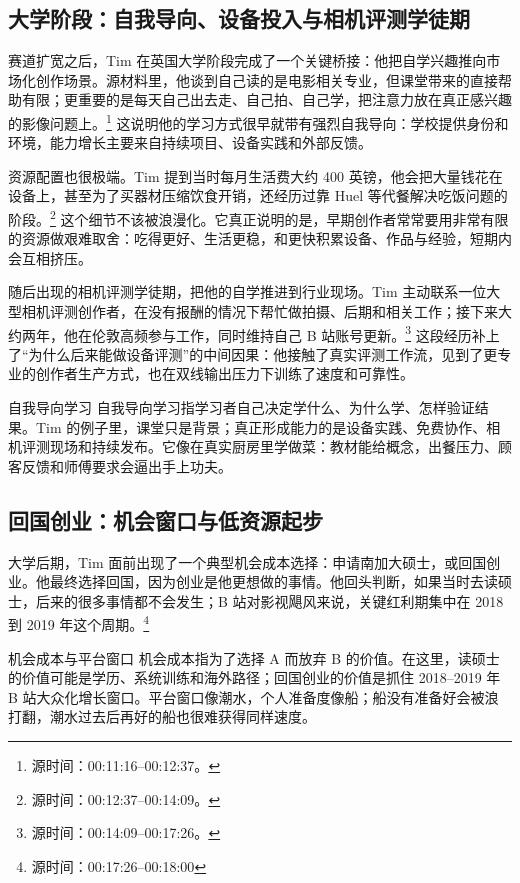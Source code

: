 \documentclass[a4paper]{article}
\begin{document}
\subsection{大学阶段：自我导向、设备投入与相机评测学徒期}

赛道扩宽之后，Tim 在英国大学阶段完成了一个关键桥接：他把自学兴趣推向市场化创作场景。源材料里，他谈到自己读的是电影相关专业，但课堂带来的直接帮助有限；更重要的是每天自己出去走、自己拍、自己学，把注意力放在真正感兴趣的影像问题上。\footnote{源时间：00:11:16--00:12:37。} 这说明他的学习方式很早就带有强烈自我导向：学校提供身份和环境，能力增长主要来自持续项目、设备实践和外部反馈。

资源配置也很极端。Tim 提到当时每月生活费大约 400 英镑，他会把大量钱花在设备上，甚至为了买器材压缩饮食开销，还经历过靠 Huel 等代餐解决吃饭问题的阶段。\footnote{源时间：00:12:37--00:14:09。} 这个细节不该被浪漫化。它真正说明的是，早期创作者常常要用非常有限的资源做艰难取舍：吃得更好、生活更稳，和更快积累设备、作品与经验，短期内会互相挤压。

随后出现的相机评测学徒期，把他的自学推进到行业现场。Tim 主动联系一位大型相机评测创作者，在没有报酬的情况下帮忙做拍摄、后期和相关工作；接下来大约两年，他在伦敦高频参与工作，同时维持自己 B 站账号更新。\footnote{源时间：00:14:09--00:17:26。} 这段经历补上了“为什么后来能做设备评测”的中间因果：他接触了真实评测工作流，见到了更专业的创作者生产方式，也在双线输出压力下训练了速度和可靠性。

\begin{knowledgebox}{自我导向学习}
自我导向学习指学习者自己决定学什么、为什么学、怎样验证结果。Tim 的例子里，课堂只是背景；真正形成能力的是设备实践、免费协作、相机评测现场和持续发布。它像在真实厨房里学做菜：教材能给概念，出餐压力、顾客反馈和师傅要求会逼出手上功夫。
\end{knowledgebox}

\subsection{回国创业：机会窗口与低资源起步}

大学后期，Tim 面前出现了一个典型机会成本选择：申请南加大硕士，或回国创业。他最终选择回国，因为创业是他更想做的事情。他回头判断，如果当时去读硕士，后来的很多事情都不会发生；B 站对影视飓风来说，关键红利期集中在 2018 到 2019 年这个周期。\footnote{源时间：00:17:26--00:18:00}

\begin{knowledgebox}{机会成本与平台窗口}
机会成本指为了选择 A 而放弃 B 的价值。在这里，读硕士的价值可能是学历、系统训练和海外路径；回国创业的价值是抓住 2018--2019 年 B 站大众化增长窗口。平台窗口像潮水，个人准备度像船；船没有准备好会被浪打翻，潮水过去后再好的船也很难获得同样速度。
\end{knowledgebox}
\end{document}

